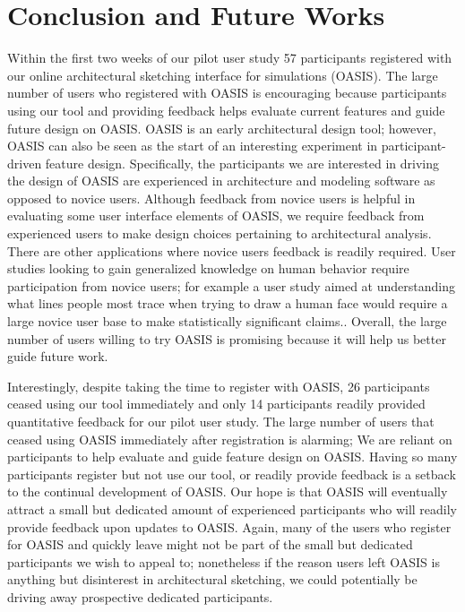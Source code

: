 \chapter{Conclusion and Future Works} \label{sec:con}


	Within the first two weeks of our pilot user study  57 participants registered with our online architectural sketching interface for simulations (OASIS).
	The large number of users who registered with OASIS is encouraging because participants using our tool and providing feedback helps evaluate current features and guide future design on OASIS.
	OASIS is an early architectural design tool; however, OASIS can also be seen as the start of an interesting experiment in participant-driven feature design.
	Specifically, the participants we are interested in driving the design of OASIS are experienced in architecture and modeling software as opposed to novice users.
	Although feedback from novice users is helpful in evaluating some user interface elements of OASIS, we require feedback from experienced users to make design choices pertaining to architectural analysis.       
	There are other applications where novice users feedback is readily required.
	User studies looking to gain generalized knowledge on human behavior require participation from novice users;
	for example a user study aimed at understanding what lines people most trace when trying to draw a human face would require a large novice user base to make statistically significant claims.\cite{limpaecher2013real}.
	Overall, the large number of users willing to try OASIS is promising because it will help us better guide future work.

	Interestingly, despite taking the time to register with OASIS, 26 participants ceased using our tool immediately and only 14 participants readily provided quantitative feedback for our pilot user study.
	The large number of users that ceased using OASIS immediately after registration is alarming;
	We are reliant on participants to help evaluate and guide feature design on OASIS.
	Having so many participants register but not use our tool, or readily provide feedback is a setback to the continual development of OASIS.
	Our hope is that OASIS will eventually attract a small but dedicated amount of experienced participants who will readily provide feedback upon updates to OASIS.
	Again, many of the users who register for OASIS and quickly leave might not be part of the small but dedicated participants we wish to appeal to;
	nonetheless if the reason users left OASIS is anything but disinterest in architectural sketching, we could potentially be driving away prospective dedicated participants.

